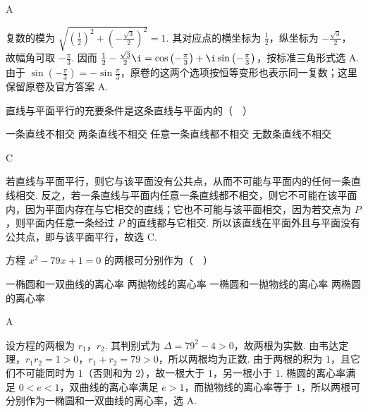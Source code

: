 \documentclass[UTF8,a4paper,oneside,11pt]{ctexbook}
\begin{document}
\begin{answer}
A
\end{answer}

\begin{solution}
复数的模为 \(\sqrt{\left(\frac{1}{2}\right)^2+\left(-\frac{\sqrt{3}}{2}\right)^2}=1\). 其对应点的横坐标为 \(\frac{1}{2}\)，纵坐标为 \(-\frac{\sqrt{3}}{2}\)，故幅角可取 \(-\frac{\pi}{3}\). 因而 \(\frac{1}{2}-\frac{\sqrt{3}}{2}\i=\cos\left(-\frac{\pi}{3}\right)+\i\sin\left(-\frac{\pi}{3}\right)\)，按标准三角形式选 A. 由于 \(\sin\left(-\frac{\pi}{3}\right)=-\sin\frac{\pi}{3}\)，原卷的这两个选项按恒等变形也表示同一复数；这里保留原卷及官方答案 A.
\end{solution}

\begin{problem}

直线与平面平行的充要条件是这条直线与平面内的（\(\quad\)）

\choices
    {一条直线不相交}
    {两条直线不相交}
    {任意一条直线都不相交}
    {无数条直线不相交}
\end{problem}

\begin{answer}
C
\end{answer}

\begin{solution}
若直线与平面平行，则它与该平面没有公共点，从而不可能与平面内的任何一条直线相交. 反之，若一条直线与平面内任意一条直线都不相交，则它不可能在该平面内，因为平面内存在与它相交的直线；它也不可能与该平面相交，因为若交点为 \(P\)，则平面内任意一条经过 \(P\) 的直线都与它相交. 所以该直线在平面外且与平面没有公共点，即与该平面平行，故选 C.
\end{solution}

\begin{problem}

方程 \(x^{2} - 79x + 1 = 0\) 的两根可分别作为（\(\quad\)）

\choices
    {一椭圆和一双曲线的离心率}
    {两抛物线的离心率}
    {一椭圆和一抛物线的离心率}
    {两椭圆的离心率}
\end{problem}

\begin{answer}
A
\end{answer}

\begin{solution}
设方程的两根为 \(r_{1}\)，\(r_{2}\). 其判别式为 \(\Delta=79^{2}-4>0\)，故两根为实数. 由韦达定理，\(r_{1}r_{2}=1>0\)，\(r_{1}+r_{2}=79>0\)，所以两根均为正数. 由于两根的积为 \(1\)，且它们不可能同时为 \(1\)（否则和为 \(2\)），故一根大于 \(1\)，另一根小于 \(1\). 椭圆的离心率满足 \(0<e<1\)，双曲线的离心率满足 \(e>1\)，而抛物线的离心率等于 \(1\)，所以两根可分别作为一椭圆和一双曲线的离心率，选 A.
\end{solution}
\end{document}

